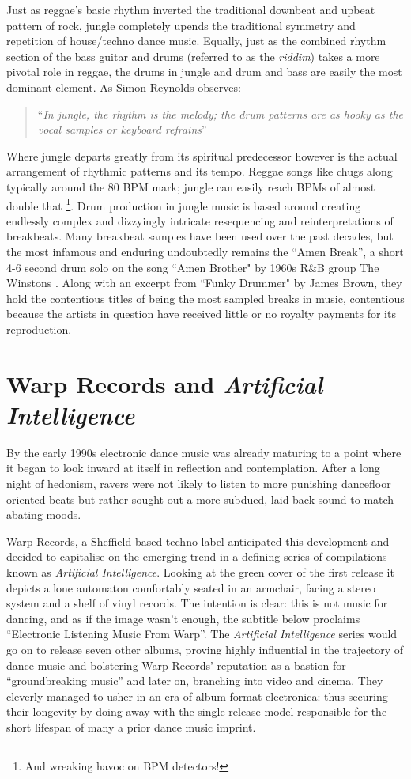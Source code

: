 Just as reggae’s basic rhythm inverted the traditional downbeat and upbeat pattern of rock, jungle completely upends the traditional symmetry and repetition of house/techno dance music. Equally, just as the combined rhythm section of the bass guitar and drums (referred to as the \textit{riddim}) takes a more pivotal role in reggae, the drums in jungle and drum and bass are easily the most dominant element. As Simon Reynolds observes:

\blockcquote[]{Reynolds2013}{``\textit{In jungle, the rhythm is the melody; the drum patterns are as hooky as the vocal samples or keyboard refrains}''}

Where jungle departs greatly from its spiritual predecessor however is the actual arrangement of rhythmic patterns and its tempo. Reggae songs like chugs along typically around the 80 BPM mark; jungle can easily reach BPMs of almost double that \footnote{And wreaking havoc on BPM detectors!}. Drum production in jungle music is based around creating endlessly complex and dizzyingly intricate resequencing and reinterpretations of breakbeats. Many breakbeat samples have been used over the past decades, but the most infamous and enduring undoubtedly remains the “Amen Break”, a short 4-6 second drum solo on the song ``Amen Brother" by 1960s R\&B group The Winstons \citep{Collins2007a}. Along with an excerpt from ``Funky Drummer" by James Brown, they hold the contentious titles of being the most sampled breaks in music, contentious because the artists in question have received little or no royalty payments for its reproduction.

\section{Warp Records and \textit{Artificial Intelligence}}

By the early 1990s electronic dance music was already maturing to a point where it began to look inward at itself in reflection and contemplation. After a long night of hedonism, ravers were not likely to listen to more punishing dancefloor oriented beats but rather sought out a more subdued, laid back sound to match abating moods.

Warp Records, a Sheffield based techno label anticipated this development and decided to capitalise on the emerging trend in a defining series of compilations known as \textit{Artificial Intelligence}. Looking at the green cover of  the first release it depicts a lone automaton comfortably seated in an armchair, facing a stereo system and a shelf of vinyl records. The intention is clear: this is not music for dancing, and as if the image wasn’t enough, the subtitle below proclaims “Electronic Listening Music From Warp”. The \textit{Artificial Intelligence} series would go on to release seven other albums, proving highly influential in the trajectory of dance music and bolstering Warp Records’ reputation as a bastion for “groundbreaking music” and later on, branching into video and cinema. They cleverly managed to usher in an era of album format electronica: thus securing their longevity by doing away with the single release model responsible for the short lifespan of many a prior dance music imprint.

